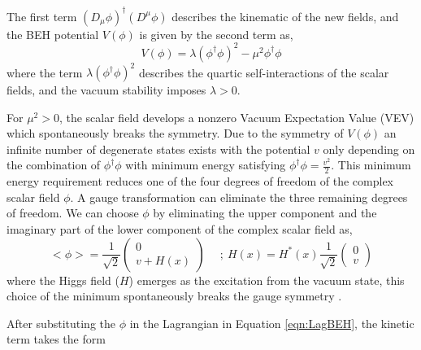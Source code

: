 The first term $(D_{\mu} \phi)^{\dagger} ( D^{\mu} \phi)$ describes the kinematic of the new fields, and the BEH potential $V(\phi)$ is given by the second term as, 
\begin{equation}
V(\phi) = \lambda (\phi^{\dagger} \phi)^2 - \mu^2 \phi^{\dagger} \phi
\label{eqn:HiggsPot}
\end{equation}
where the term $\lambda (\phi^{\dagger} \phi)^2$ describes the quartic self-interactions of the scalar fields, and the vacuum stability imposes $\lambda > 0 $. 

For $\mu^2 > 0$, the scalar field develops a nonzero Vacuum Expectation Value (VEV) which spontaneously breaks the symmetry. Due to the symmetry of $V(\phi)$ an infinite number of degenerate states exists with the potential $v$ only depending on the combination of $\phi^{\dagger}\phi$ 
\cite{PeskinQFT} with minimum energy satisfying $\phi^{\dagger}\phi = \frac{v^2}{2}$. This minimum energy requirement reduces one of the four degrees of freedom of the complex scalar field $\phi$. A gauge transformation can eliminate the three remaining degrees of freedom. We can choose $\phi$ by eliminating the upper component and the imaginary part of the lower component of the complex scalar field as,
\begin{equation}
<\phi> = \frac{1}{\sqrt{2}}\begin{pmatrix} 0 \\ v+H(x) \end{pmatrix}~ \hspace{10pt} ~;~ H(x) = H^{*}(x) 
 \frac{1}{\sqrt{2}} \begin{pmatrix} 0 \\ v \end{pmatrix}
\label{eqn:ScalarExp}
\end{equation}
where the Higgs field ($H$) emerges as the excitation from the vacuum state, this choice of the minimum spontaneously breaks the gauge symmetry \cite{DESYHiggsLecture}. 

After substituting the $\phi$ in the Lagrangian in Equation \ref{eqn:LagBEH}, the kinetic term takes the form


